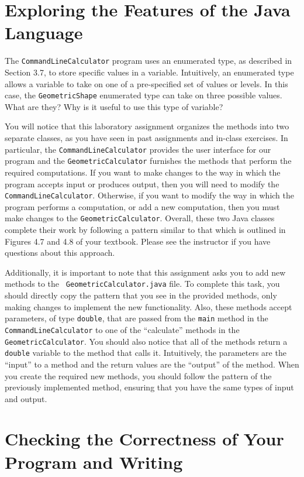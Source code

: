 \documentclass[11pt]{article}
\begin{document}
\section*{Exploring the Features of the Java Language}

The {\tt CommandLineCalculator} program uses an enumerated type, as described in Section 3.7, to store specific values in
a variable. Intuitively, an enumerated type allows a variable to take on one of a pre-specified set of values or levels.
In this case, the {\tt GeometricShape} enumerated type can take on three possible values. What are they? Why is it
useful to use this type of variable?

You will notice that this laboratory assignment organizes the methods into two separate classes, as you have seen in
past assignments and in-class exercises. In particular, the {\tt CommandLineCalculator} provides the user interface for
our program and the {\tt GeometricCalculator} furnishes the methods that perform the required computations.  If you want
to make changes to the way in which the program accepts input or produces output, then you will need to modify the {\tt
CommandLineCalculator}. Otherwise, if you want to modify the way in which the program performs a computation, or add a new
computation, then you must make changes to the {\tt GeometricCalculator}. Overall, these two Java classes complete their
work by following a pattern similar to that which is outlined in Figures 4.7 and 4.8 of your textbook. Please see the
instructor if you have questions about this approach.

Additionally, it is important to note that this assignment asks you to add new methods to the {\tt
GeometricCalculator.java} file. To complete this task, you should directly copy the pattern that you see in the
provided methods, only making changes to implement the new functionality. Also, these methods accept parameters, of
type {\tt double}, that are passed from the {\tt main} method in the {\tt CommandLineCalculator} to one of the
``calculate'' methods in the {\tt GeometricCalculator}. You should also notice that all of the methods return a {\tt
double} variable to the method that calls it. Intuitively, the parameters are the ``input'' to a method and the return
values are the ``output'' of the method. When you create the required new methods, you should follow the pattern of the
previously implemented method, ensuring that you have the same types of input and output.

\section*{Checking the Correctness of Your Program and Writing}
\end{document}
